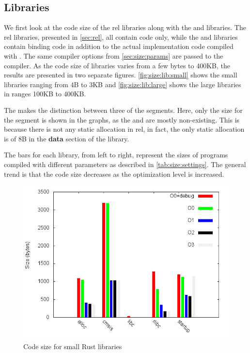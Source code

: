 \subsection{Libraries}

We first look at the code size of the \gls{rel} libraries along with the  and  libraries.
The \gls{rel} libraries, presented in \autoref{sec:rel}, all contain {\rust} code only, while the  and  libraries contain {\rust} binding code in addition to the actual {\C} implementation code compiled with .
The same compiler options from \autoref{sec:size:params} are passed to the {\C} compiler.
As the code size of libraries varies from a few bytes to 400KB, the results are presented in two separate figures.
\autoref{fig:size:lib:small} shows the small libraries ranging from 4B to 3KB and \autoref{fig:size:lib:large} shows the large libraries in ranges 100KB to 400KB.

The  makes the distinction between three of the {\elf} segments.
Here, only the size for the  segment is shown in the graphs, as the  and  are mostly non-existing.
This is because there is not any static allocation in \gls{rel}, in fact, the only static allocation is of 8B in the \textbf{data} section of the  library.

The bars for each library, from left to right, represent the sizes of programs compiled with different parameters as described in \autoref{tab:size:settings}.
The general trend is that the code size decreases as the optimization level is increased.

\begin{figure}[H]
  \begin{center}
    \includegraphics[scale=0.5]{results/plots/size/lib/small/size.png}
  \end{center}
  \caption{Code size for small Rust libraries}
  \label{fig:size:lib:small}
\end{figure}

